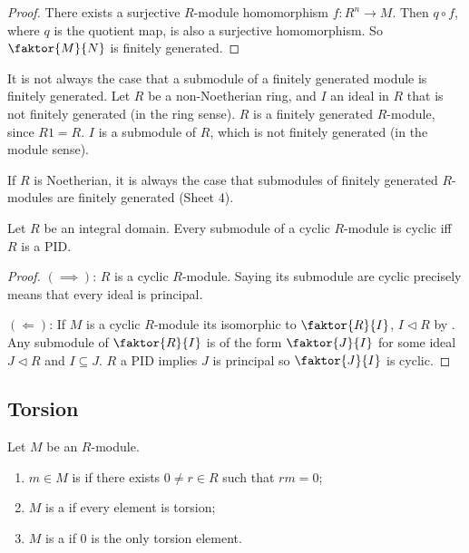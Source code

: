 \begin{proof}
	There exists a surjective $R$-module homomorphism $f : R^n \to M$.
	Then $q \circ f$, where $q$ is the quotient map, is also a surjective homomorphism.
	So $\faktor{M}{N}$ is finitely generated.
\end{proof}

\begin{example}
	It is not always the case that a submodule of a finitely generated module is finitely generated.
	Let $R$ be a non-Noetherian ring, and $I$ an ideal in $R$ that is not finitely generated (in the ring sense).
	$R$ is a finitely generated $R$-module, since $R1 = R$.
	$I$ is a submodule of $R$, which is not finitely generated (in the module sense).
\end{example}

\begin{remark}
	If $R$ is Noetherian, it is always the case that submodules of finitely generated $R$-modules are finitely generated (Sheet 4).
\end{remark}

\begin{lemma} \label{lem:14.4}
	Let $R$ be an integral domain.
	Every submodule of a cyclic $R$-module is cyclic iff $R$ is a PID.
\end{lemma} 

\begin{proof}
	$(\implies)$: $R$ is a cyclic $R$-module.
	Saying its submodule are cyclic precisely means that every ideal is principal.

	$(\Longleftarrow)$: If $M$ is a cyclic $R$-module its isomorphic to $\faktor{R}{I}$, $I \triangleleft R$ by .
	Any submodule of $\faktor{R}{I}$ is of the form $\faktor{J}{I}$ for some ideal $J \triangleleft R$ and $I \subseteq J$.
	$R$ a PID implies $J$ is principal so $\faktor{J}{I}$ is cyclic.
\end{proof} 

\subsection{Torsion}
\begin{definition}[Torsion]
	Let $M$ be an $R$-module.
	\begin{enumerate}
		\item $m \in M$ is  if there exists $0 \neq r \in R$ such that $rm = 0$;
		\item $M$ is a  if every element is torsion;
		\item $M$ is a  if 0 is the only torsion element.
	\end{enumerate}
\end{definition}

